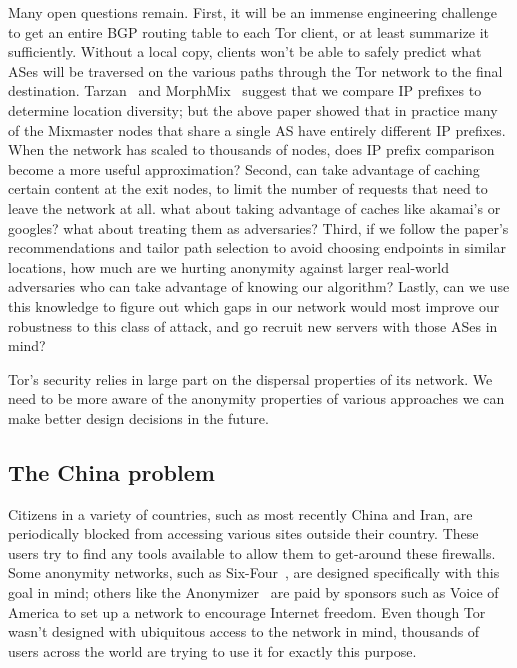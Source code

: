 \documentclass{llncs}
\begin{document}
Many open questions remain. First, it will be an immense engineering
challenge to get an entire BGP routing table to each Tor client, or at
least summarize it sufficiently. Without a local copy, clients won't be
able to safely predict what ASes will be traversed on the various paths
through the Tor network to the final destination. Tarzan~\cite{tarzan:ccs02}
and MorphMix~\cite{morphmix:fc04} suggest that we compare IP prefixes to
determine location diversity; but the above paper showed that in practice
many of the Mixmaster nodes that share a single AS have entirely different
IP prefixes. When the network has scaled to thousands of nodes, does IP
prefix comparison become a more useful approximation?
%
Second, can take advantage of caching certain content at the exit nodes, to
limit the number of requests that need to leave the network at all.
what about taking advantage of caches like akamai's or googles? what
about treating them as adversaries?
%
Third, if we follow the paper's recommendations and tailor path selection
to avoid choosing endpoints in similar locations, how much are we hurting
anonymity against larger real-world adversaries who can take advantage
of knowing our algorithm?
%
Lastly, can we use this knowledge to figure out which gaps in our network
would most improve our robustness to this class of attack, and go recruit
new servers with those ASes in mind?

Tor's security relies in large part on the dispersal properties of its
network. We need to be more aware of the anonymity properties of various
approaches we can make better design decisions in the future.

\subsection{The China problem}
\label{subsec:china}

Citizens in a variety of countries, such as most recently China and
Iran, are periodically blocked from accessing various sites outside
their country. These users try to find any tools available to allow
them to get-around these firewalls. Some anonymity networks, such as
Six-Four~\cite{six-four}, are designed specifically with this goal in
mind; others like the Anonymizer~\cite{anonymizer} are paid by sponsors
such as Voice of America to set up a network to encourage Internet
freedom. Even though Tor wasn't
designed with ubiquitous access to the network in mind, thousands of
users across the world are trying to use it for exactly this purpose.
\end{document}
